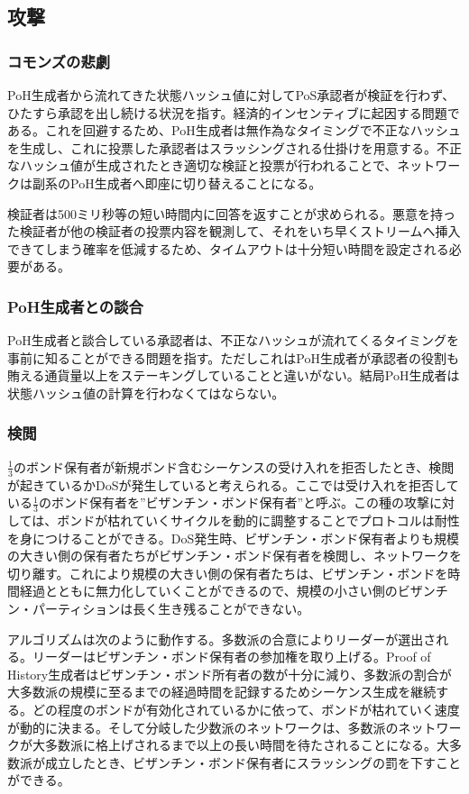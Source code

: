 \documentclass[12pt]{ltjsarticle}
\begin{document}
\subsection{攻撃}
\subsubsection{コモンズの悲劇}
PoH生成者から流れてきた状態ハッシュ値に対してPoS承認者が検証を行わず、ひたすら承認を出し続ける状況を指す。経済的インセンティブに起因する問題である。これを回避するため、PoH生成者は無作為なタイミングで不正なハッシュを生成し、これに投票した承認者はスラッシングされる仕掛けを用意する。不正なハッシュ値が生成されたとき適切な検証と投票が行われることで、ネットワークは副系のPoH生成者へ即座に切り替えることになる。

検証者は500ミリ秒等の短い時間内に回答を返すことが求められる。悪意を持った検証者が他の検証者の投票内容を観測して、それをいち早くストリームへ挿入できてしまう確率を低減するため、タイムアウトは十分短い時間を設定される必要がある。

\subsubsection{PoH生成者との談合}\label{subsubsec:collusion}
PoH生成者と談合している承認者は、不正なハッシュが流れてくるタイミングを事前に知ることができる問題を指す。ただしこれはPoH生成者が承認者の役割も賄える通貨量以上をステーキングしていることと違いがない。結局PoH生成者は状態ハッシュ値の計算を行わなくてはならない。

\subsubsection{検閲}\label{censorship}
\(\frac{1}{3}\)のボンド保有者が新規ボンド含むシーケンスの受け入れを拒否したとき、検閲が起きているかDoSが発生していると考えられる。ここでは受け入れを拒否している\(\frac{1}{3}\)のボンド保有者を”ビザンチン・ボンド保有者”と呼ぶ。この種の攻撃に対しては、ボンドが枯れていくサイクルを動的に調整することでプロトコルは耐性を身につけることができる。DoS発生時、ビザンチン・ボンド保有者よりも規模の大きい側の保有者たちがビザンチン・ボンド保有者を検閲し、ネットワークを切り離す。これにより規模の大きい側の保有者たちは、ビザンチン・ボンドを時間経過とともに無力化していくことができるので、規模の小さい側のビザンチン・パーティションは長く生き残ることができない。

アルゴリズムは次のように動作する。多数派の合意によりリーダーが選出される。リーダーはビザンチン・ボンド保有者の参加権を取り上げる。Proof of History生成者はビザンチン・ボンド所有者の数が十分に減り、多数派の割合が大多数派の規模に至るまでの経過時間を記録するためシーケンス生成を継続する。どの程度のボンドが有効化されているかに依って、ボンドが枯れていく速度が動的に決まる。そして分岐した少数派のネットワークは、多数派のネットワークが大多数派に格上げされるまで以上の長い時間を待たされることになる。大多数派が成立したとき、ビザンチン・ボンド保有者にスラッシングの罰を下すことができる。
\end{document}
